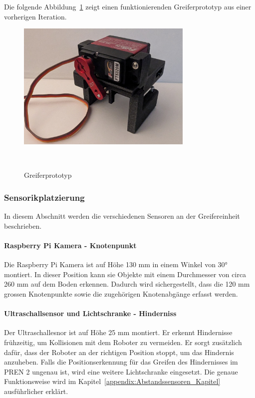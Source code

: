 \documentclass[main.tex]{subfiles} %
\begin{document}
\newpage

Die folgende Abbildung~\ref{fig:Greiferprototyp} zeigt einen funktionierenden Greiferprototyp 
aus einer vorherigen Iteration.

\begin{figure}[H]
    \centering
    \includegraphics[width=0.75\textwidth]{Greiferprototyp.jpg}
    \caption{Greiferprototyp}~\label{fig:Greiferprototyp}
\end{figure}

\subsubsection*{Sensorikplatzierung}

In diesem Abschnitt werden die verschiedenen Sensoren an der Greifereinheit beschrieben.

\paragraph{Raspberry Pi Kamera - Knotenpunkt}
Die Raspberry Pi Kamera ist auf Höhe 130 mm in einem Winkel von 30° montiert.
In dieser Position kann sie Objekte mit einem Durchmesser von circa 260 mm auf dem Boden erkennen.
Dadurch wird sichergestellt, dass die 120 mm grossen Knotenpunkte sowie die zugehörigen
Knotenabgänge erfasst werden.


\paragraph{Ultraschallsensor und Lichtschranke - Hinderniss}
Der Ultraschallesnor ist auf Höhe 25 mm montiert. Er erkennt Hindernisse frühzeitig,
um Kollisionen mit dem Roboter zu vermeiden. Er sorgt zusätzlich dafür, dass der Roboter an der richtigen 
Position stoppt, um das Hindernis anzuheben. Falls die Positionserkennung für das Greifen 
des Hindernisses im PREN 2 ungenau ist, wird eine weitere Lichtschranke eingesetzt.
Die genaue Funktionsweise wird im Kapitel~\ref{appendix:Abstandssensoren_Kapitel} ausführlicher erklärt.
\end{document}
